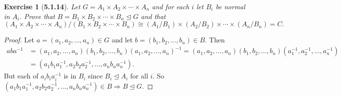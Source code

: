 \documentclass[10pt,oneside,reqno]{amsart}
\theoremstyle{plain}
\newtheorem*{e}{Exercise}
\theoremstyle{definition}
\newcommand{\norm}{\trianglelefteq}
\begin{document}
\begin{e}[\textbf{5.1.14}]
Let $G = A_1 \times A_2 \times \cdots \times A_n$ and for each $i$ let $B_i$ be normal in $A_i$. Prove that $B=B_1 \times B_2 \times \cdots \times B_n \norm G$ and that 
\[(A_1 \times A_2 \times \cdots \times A_n)/(B_1 \times B_2 \times \cdots \times B_n) \cong (A_1/B_1) \times (A_2/B_2) \times \cdots \times (A_n/B_n) = C. \]

\end{e}
\begin{proof}
Let $a = (a_1,a_2,...,a_n) \in G$ and let $b= (b_1,b_2,...,b_n) \in B$. Then
\begin{equation}
\begin{aligned}
aba^{-1} &= (a_1,a_2,...,a_n)(b_1,b_2,...,b_n)(a_1,a_2,...,a_n)^{-1} = (a_1,a_2,...,a_n)(b_1,b_2,...,b_n)(a_1^{-1},a_2^{-1},...,a_n^{-1})\\
&= (a_1b_1a_1^{-1},a_2b_2a_2^{-1},...,a_nb_na_n^{-1}). 
\end{aligned}
\end{equation}
But each of $a_ib_ia_i^{-1}$ is in $B_i$ since $B_i \norm A_i$ for all $i$. So $(a_1b_1a_1^{-1},a_2b_2a_2^{-1},...,a_nb_na_n^{-1}) \in B \Rightarrow B \norm G$. 


\end{proof}
\end{document}
